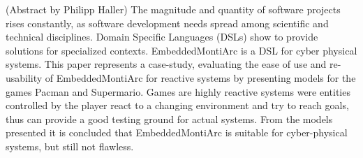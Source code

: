 (Abstract by Philipp Haller)
The magnitude and quantity of software projects rises constantly, as software development needs spread among scientific and technical disciplines. Domain Specific Languages (DSLs) show to provide solutions for specialized contexts. EmbeddedMontiArc is a DSL for cyber physical systems.
This paper represents a case-study, evaluating the ease of use and re-usability of EmbeddedMontiArc for reactive systems by presenting models for the games Pacman and Supermario. Games are highly reactive systems were entities controlled by the player react to a changing environment and try to reach goals, thus can provide a good testing ground for actual systems.
From the models presented it is concluded that EmbeddedMontiArc is suitable for cyber-physical systems, but still not flawless.

